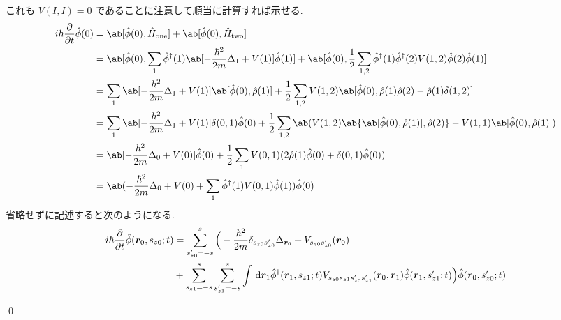 \documentclass[uplatex,dvipdfmx,a4paper,11pt]{jlreq}
\makeatletter
\newcommand{\rr}{\bm{r}}
\numberwithin{equation}{section}
\theoremstyle{definition}
\renewenvironment{proof}[1][\proofname]{\par
  \normalfont
  \topsep6\p@\@plus6\p@ \trivlist
  \item[\hskip\labelsep{\bfseries #1}\@addpunct{\bfseries}]\ignorespaces\quad\par
}{
  \qed\endtrivlist\@endpefalse
}
\renewcommand\proofname{証明}
\makeatother
\begin{document}
\begin{proof}
  これも $V(I, I) = 0$ であることに注意して順当に計算すれば示せる.
  \begin{align}
    i\hbar\diffp{}{t}\hat{\phi}(0) & = \ab[\hat{\phi}(0), \hat{H}_{\mathrm{one}}] + \ab[\hat{\phi}(0), \hat{H}_{\mathrm{two}}]                                                                                                                                        \\
                                   & = \ab[\hat{\phi}(0), \sum_{1}\hat{\phi}^\dagger(1)\ab[-\frac{\hbar^2}{2m}\Delta_{1} + V(1)]\hat{\phi}(1)] + \ab[\hat{\phi}(0), \frac{1}{2}\sum_{1,2}\hat{\phi}^\dagger(1)\hat{\phi}^\dagger(2)V(1, 2)\hat{\phi}(2)\hat{\phi}(1)] \\
                                   & = \sum_{1}\ab[-\frac{\hbar^2}{2m}\Delta_{1} + V(1)]\ab[\hat{\phi}(0), \hat{\rho}(1)] + \frac{1}{2}\sum_{1,2}V(1, 2)\ab[\hat{\phi}(0), \hat{\rho}(1)\hat{\rho}(2) - \hat{\rho}(1)\delta(1, 2)]                                    \\
                                   & = \sum_{1}\ab[-\frac{\hbar^2}{2m}\Delta_{1} + V(1)]\delta(0, 1)\hat{\phi}(0) + \frac{1}{2}\sum_{1,2}\ab(V(1, 2)\ab\{\ab[\hat{\phi}(0), \hat{\rho}(1)], \hat{\rho}(2)\} - V(1, 1)\ab[\hat{\phi}(0), \hat{\rho}(1)])               \\
                                   & = \ab[-\frac{\hbar^2}{2m}\Delta_{0} + V(0)]\hat{\phi}(0) + \frac{1}{2}\sum_{1}V(0, 1)(2\hat{\rho}(1)\hat{\phi}(0) + \delta(0, 1)\hat{\phi}(0))                                                                                   \\
                                   & = \ab(-\frac{\hbar^2}{2m}\Delta_0 + V(0) + \sum_{1}\hat{\phi}^\dagger(1)V(0, 1)\hat{\phi}(1))\hat{\phi}(0)
  \end{align}
  省略せずに記述すると次のようになる.
  \begin{align}
    i\hbar\diffp{}{t}\hat{\phi}(\rr_0, s_{z0}; t) & = \sum_{s_{z0}' = -s}^{s}\Big(-\frac{\hbar^2}{2m}\delta_{s_{z0}s_{z0}'}\Delta_{\rr_0} + V_{s_{z0}s_{z0}'}(\rr_0)                                                                                             \\
                                                  & + \sum_{s_{z1} = -s}^{s}\sum_{s_{z1}' = -s}^{s}\int\dl{\rr_1}\hat{\phi}^\dagger(\rr_1, s_{z1}; t)V_{s_{z0}s_{z1}s_{z0}'s_{z1}'}(\rr_0, \rr_1)\hat{\phi}(\rr_1, s_{z1}'; t)\Big)\hat{\phi}(\rr_0, s_{z0}'; t)
  \end{align}
\end{proof}
\end{document}
